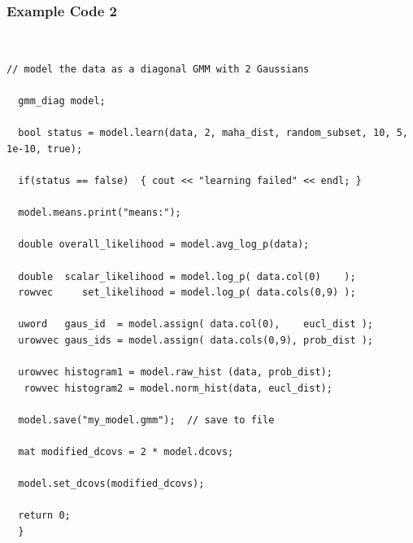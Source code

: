 \documentclass[usenames,dvipsnames]{beamer}
\begin{document}
\begin{frame}[fragile=singleslide]
\frametitle{Example Code 2}

\begin{minipage}{1.00\textwidth}
\begin{minipage}{0.05\textwidth}
~
\end{minipage}
\begin{minipage}{0.90\textwidth}
\begin{Verbatim}[fontsize=\tiny]
  // model the data as a diagonal GMM with 2 Gaussians
  
  gmm_diag model;
  
  bool status = model.learn(data, 2, maha_dist, random_subset, 10, 5, 1e-10, true);
  
  if(status == false)  { cout << "learning failed" << endl; }
  
  model.means.print("means:");
  
  double overall_likelihood = model.avg_log_p(data);
  
  double  scalar_likelihood = model.log_p( data.col(0)    );
  rowvec     set_likelihood = model.log_p( data.cols(0,9) );
  
  uword   gaus_id  = model.assign( data.col(0),    eucl_dist );
  urowvec gaus_ids = model.assign( data.cols(0,9), prob_dist );
  
  urowvec histogram1 = model.raw_hist (data, prob_dist);
   rowvec histogram2 = model.norm_hist(data, eucl_dist);
  
  model.save("my_model.gmm");  // save to file
  
  mat modified_dcovs = 2 * model.dcovs;
  
  model.set_dcovs(modified_dcovs);
  
  return 0;
  }
\end{Verbatim}
\end{minipage}
\end{minipage}
\end{frame}

%
%
%
\end{document}
